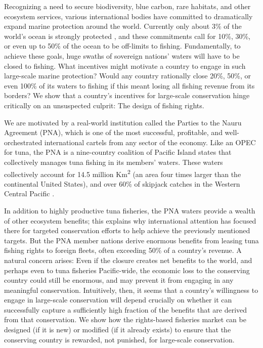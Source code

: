\documentclass[12pt]{article}
\begin{document}

Recognizing a need to secure biodiversity, blue carbon, rare habitats, and other ecosystem services, various international bodies have committed to dramatically expand marine protection around the world. Currently only about 3\% of the world's ocean is strongly protected \cite{sala_2018}, and these commitments call for 10\%, 30\%, or even up to 50\% of the ocean to be off-limits to fishing. Fundamentally, to achieve these goals, huge swaths of sovereign nations' waters will have to be closed to fishing. What incentives might motivate a country to engage in such large-scale marine protection? Would any country rationally close 20\%, 50\%, or even 100\% of its waters to fishing if this meant losing all fishing revenue from its borders? We show that a country's incentives for large-scale conservation hinge critically on an unsuspected culprit: The design of fishing rights.

We are motivated by a real-world institution called the Parties to the Nauru Agreement (PNA), which is one of the most successful, profitable, and well-orchestrated international cartels from any sector of the economy. Like an OPEC for tuna, the PNA is a nine-country coalition of Pacific Island states that collectively manages tuna fishing in its members' waters\cite{havice_2013,aqorau_2018}. These waters collectively account for 14.5 million Km\textsuperscript{2} (an area four times larger than the continental United States), and over 60\% of skipjack catches in the Western Central Pacific \cite{havice_2013}.

In addition to highly productive tuna fisheries, the PNA waters provide a wealth of other ecosystem benefits; this explains why international attention has focused there for targeted conservation efforts to help achieve the previously mentioned targets. But the PNA member nations derive enormous benefits from leasing tuna fishing rights to foreign fleets, often exceeding 50\% of a country's revenue. A natural concern arises: Even if the closure creates net benefits to the world, and perhaps even to tuna fisheries Pacific-wide, the economic loss to the conserving country could still be enormous, and may prevent it from engaging in any meaningful conservation. Intuitively, then, it seems that a country's willingness to engage in large-scale conservation will depend crucially on whether it can successfully capture a sufficiently high fraction of the benefits that are derived from that conservation. We show how the rights-based fisheries market can be designed (if it is new) or modified (if it already exists) to ensure that the conserving country is rewarded, not punished, for large-scale conservation.
\end{document}
